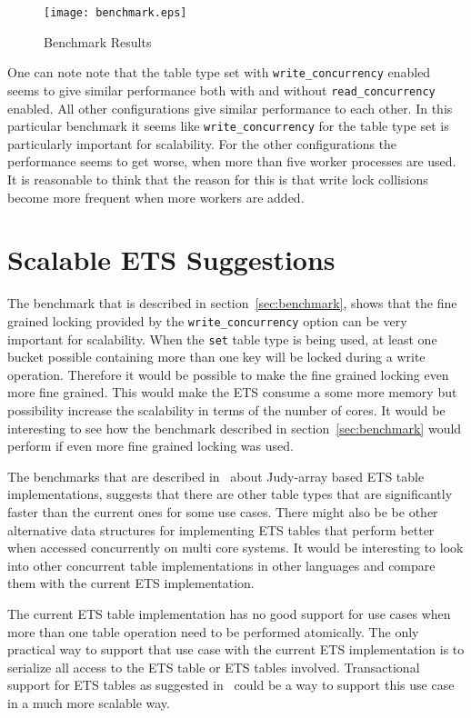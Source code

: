 \documentclass[aps,pre,preprint,nofootinbib]{revtex4}
\begin{document}
  
\begin{figure}[htb]
\centering
\texttt{[image: benchmark.eps]}
\caption{Benchmark Results} 
\label{fig:benchmark_results}
\end{figure}

  One can note note that the table type set with \verb|write_concurrency| enabled seems to give similar performance both with and without \verb|read_concurrency| enabled.
  All other configurations give similar performance to each other.
  In this particular benchmark it seems like \verb|write_concurrency| for the table type set is particularly important for scalability.
  For the other configurations the performance seems to get worse, when more than five worker processes are used.
  It is reasonable to think that the reason for this is that write lock collisions become more frequent when more workers are added.
  
  
  
\section{Scalable ETS Suggestions}

  The benchmark that is described in section~\ref{sec:benchmark}, shows that the fine grained locking provided by the \verb|write_concurrency| option can be very important for scalability.
  When the \verb|set| table type is being used, at least one bucket possible containing more than one key will be locked during a write operation.
  Therefore it would be possible to make the fine grained locking even more fine grained.
  This would make the ETS consume a some more memory but possibility increase the scalability in terms of the number of cores.
  It would be interesting to see how the benchmark described in section~\ref{sec:benchmark} would perform if even more fine grained locking was used.
  
  The benchmarks that are described in~\cite{ScottEtsJudy} about Judy-array based ETS table implementations, suggests that there are other table types that are significantly faster than the current ones for some use cases.
  There might also be be other alternative data structures for implementing ETS tables that perform better when accessed concurrently on multi core systems.
  It would be interesting to look into other concurrent table implementations in other languages and compare them with the current ETS implementation.
  
  The current ETS table implementation has no good support for use cases when more than one table operation need to be performed atomically.
  The only practical way to support that use case with the current ETS implementation is to serialize all access to the ETS table or ETS tables involved.
  Transactional support for ETS tables as suggested in~\cite{PatrikErlangTrans} could be a way to support this use case in a much more scalable way.
  
\end{document}
